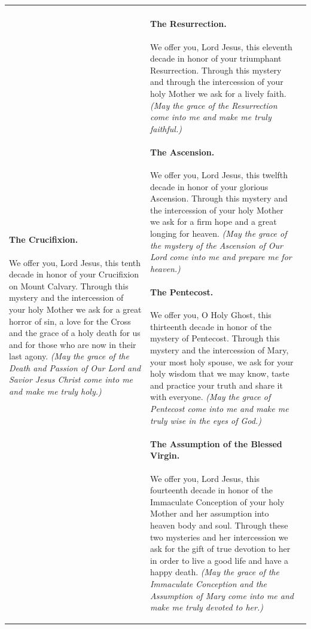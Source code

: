\documentclass{article}
\begin{document}
\begin{tabularx}{\textwidth}{ |X|X|X| }
\paragraph{The Crucifixion.} We offer you, Lord Jesus, this tenth decade in honor of your Crucifixion on Mount Calvary. Through this mystery and the intercession of your holy Mother we ask for a great horror of sin, a love for
the Cross and the grace of a holy death for us and for those who are now in their last agony. \textit{(May the grace of the Death and Passion of Our Lord and Savior Jesus Christ come into me and make me truly holy.)}
&
\paragraph{The Resurrection.} We offer you, Lord Jesus, this eleventh decade in honor of your triumphant Resurrection. Through this mystery and through the intercession of your holy Mother we ask for a lively faith. \textit{(May the grace of the Resurrection come into me and make me truly faithful.)}
\paragraph{The Ascension.} We offer you, Lord Jesus, this twelfth decade in honor of your glorious Ascension. Through this mystery and the intercession of your holy Mother we ask for a firm hope and a great longing for heaven. \textit{(May the grace of the mystery of the Ascension of Our Lord come into me and prepare me for
heaven.)}
\paragraph{The Pentecost.} We offer you, O Holy Ghost, this thirteenth decade in honor of the mystery of Pentecost. Through this mystery and the intercession of Mary, your most holy spouse, we ask for your holy wisdom that we may know, taste and practice your truth and share it with everyone. \textit{(May the grace of Pentecost come into me and make me truly wise in the eyes of God.)}
\paragraph{The Assumption of the Blessed Virgin.} We offer you, Lord Jesus, this fourteenth decade in honor of the Immaculate Conception of your holy Mother and her assumption into heaven body and soul. Through these two mysteries and her intercession we ask for the gift of true devotion to her in order to live a good life and have a happy death. \textit{(May the grace of the Immaculate Conception and the Assumption of Mary come into me and make
me truly devoted to her.)}


\end{tabularx}
\end{document}
